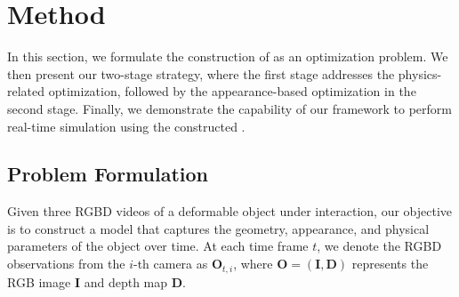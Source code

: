 \section{Method}

In this section, we formulate the construction of \ourabbr as an optimization problem. We then present our two-stage strategy, where the first stage addresses the physics-related optimization, followed by the appearance-based optimization in the second stage. Finally, we demonstrate the capability of our framework to perform real-time simulation using the constructed \ourabbr.


\subsection{Problem Formulation}
\label{sec:ps}
Given three RGBD videos of a deformable object under interaction, our objective is to construct a \ourabbr model that captures the geometry, appearance, and physical parameters of the object over time. At each time frame \( t \), we denote the RGBD observations from the \( i \)-th camera as \( \mathbf{O}_{t,i} \), where \( \mathbf{O} = (\mathbf{I}, \mathbf{D}) \) represents the RGB image \( \mathbf{I} \) and depth map \( \mathbf{D} \).


